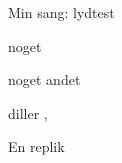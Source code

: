 \begin{Sang}[noget]{Min sang: lydtest}

	\begin{Lydeffekter}
		\item noget
		\item noget andet
	\end{Lydeffekter}



	\begin{Regi}
		diller  , \fuldscene{}
	\end{Regi}

	\begin{Replik}[B]
		 En replik
	\end{Replik}

\end{Sang}

